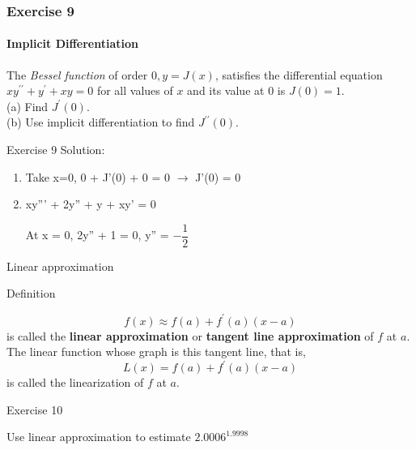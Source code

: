 \documentclass{beamer}
\begin{document}
\begin{frame}
\frametitle{Exercise 9}
\framesubtitle{Implicit Differentiation}
    The \textit{Bessel function} of order $0, y=J(x)$, satisfies the differential equation $x y^{\prime \prime}+y^{\prime}+x y=0$ for all values of $x$ and its value at 0 is $J(0)=1$.\\
(a) Find $J^{\prime}(0)$.\\
(b) Use implicit differentiation to find $J^{\prime \prime}(0)$.
\end{frame}

\begin{frame}{Exercise 9}
Solution:
\begin{enumerate}
    \item Take x=0, 0 + J'(0) + 0 = 0 $\rightarrow$ J'(0) = 0
    \item xy''' + 2y'' + y + xy' = 0
    
    At x = 0, 2y'' + 1 = 0, y'' = $-\dfrac{1}{2}$
\end{enumerate}
    
\end{frame}

\begin{frame}{Linear approximation}
\begin{block}{Definition}

$$
f(x) \approx f(a)+f^{\prime}(a)(x-a)
$$
is called the \textbf{linear approximation} or \textbf{tangent line approximation} of $f$ at $a$. The linear function whose graph is this tangent line, that is,\\

$$
L(x)=f(a)+f^{\prime}(a)(x-a)
$$
is called the linearization of $f$ at $a$.
\end{block}
\end{frame}
\begin{frame}{Exercise 10}
    \begin{block}{}
    Use linear approximation to estimate $2.0006^{1.9998}$
    \end{block}
\end{frame}
\end{document}
